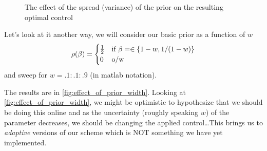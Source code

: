 \begin{figure}[h]
\begin{center}
\caption[labelInTOC]{The effect of the spread (variance) of the prior on the
resulting optimal control}
\label{fig:prior_spread}
\end{center}
\end{figure}

Let's look at it another way, we will consider our basic prior as a function of
$w$
\begin{equation}
\rho(\beta) = 
\begin{cases}
	\tfrac 12 & \textrm{if } \beta= \in \{1- w, 1/(1-w) \}\\
	0   &\textrm{o/w }
\end{cases} 
\end{equation} 
and sweep for $w = .1:.1:.9$ (in matlab notation).

The results are in \cref{fig:effect_of_prior_width}. Looking at
\cref{fig:effect_of_prior_width}, we might be optimistic to hypothesize that we
should be doing this online and as the uncertainty (roughly speaking $w$) of the
parameter decreases, we should be changing the applied control\ldots This
brings us to {\sl adaptive } versions of our scheme which is NOT something we
have yet implemented. 
 
